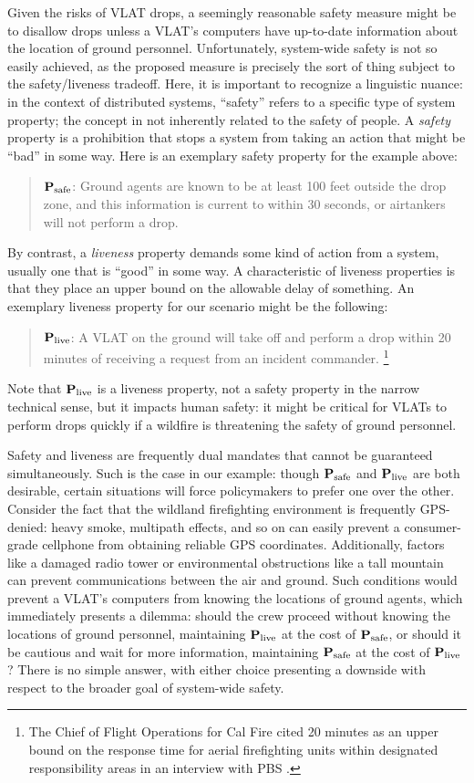 \documentclass[]             %
{NASA}                       %
\theoremstyle{definition}
\begin{document}
Given the risks of VLAT drops, a seemingly reasonable safety measure
might be to disallow drops unless a VLAT's computers have up-to-date
information about the location of ground personnel. Unfortunately,
system-wide safety is not so easily achieved, as the proposed measure
is precisely the sort of thing subject to the safety/liveness
tradeoff. Here, it is important to recognize a linguistic nuance: in
the context of distributed systems, ``safety'' refers to a specific
type of system property; the concept in not inherently related to the
safety of people. A \emph{safety} property is a prohibition that stops
a system from taking an action that might be ``bad'' in some way. Here
is an exemplary safety property for the example above:
\begin{quote}
  $\textbf{P}_\textrm{safe}$: Ground agents are known to be at least
  100 feet outside the drop zone, and this information is current to
  within 30 seconds, or airtankers will not perform a drop.
\end{quote}
By contrast, a \emph{liveness} property demands some kind of action
from a system, usually one that is ``good'' in some way. A
characteristic of liveness properties is that they place an upper
bound on the allowable delay of something. An exemplary liveness
property for our scenario might be the following:
\begin{quote}
  $\textbf{P}_\textrm{live}$: A VLAT on the ground will take off and
  perform a drop within 20 minutes of receiving a request from an
  incident commander. \footnote{The Chief of Flight Operations for Cal
    Fire cited 20 minutes as an upper bound on the response time for
    aerial firefighting units within designated responsibility areas
    in an interview with PBS \cite{2021:aerialfirefighting}.}
\end{quote} Note that $\textbf{P}_\textrm{live}$
is a liveness property, not a safety property in the narrow technical
sense, but it impacts human safety: it might be critical for VLATs to
perform drops quickly if a wildfire is threatening the safety of
ground personnel.

Safety and liveness are frequently dual mandates that cannot be
guaranteed simultaneously. Such is the case in our example: though
$\textbf{P}_\textrm{safe}$ and $\textbf{P}_\textrm{live}$ are both
desirable, certain situations will force policymakers to prefer one
over the other. Consider the fact that the wildland firefighting
environment is frequently GPS-denied: heavy smoke, multipath effects,
and so on can easily prevent a consumer-grade cellphone from obtaining
reliable GPS coordinates. Additionally, factors like a damaged radio
tower or environmental obstructions like a tall mountain can prevent
communications between the air and ground. Such conditions would
prevent a VLAT's computers from knowing the locations of ground
agents, which immediately presents a dilemma: should the crew proceed
without knowing the locations of ground personnel, maintaining
$\textbf{P}_\textrm{live}$ at the cost of $\textbf{P}_\textrm{safe}$,
or should it be cautious and wait for more information, maintaining
$\textbf{P}_\textrm{safe}$ at the cost of $\textbf{P}_\textrm{live}$?
There is no simple answer, with either choice presenting a downside
with respect to the broader goal of system-wide safety.
\end{document}
